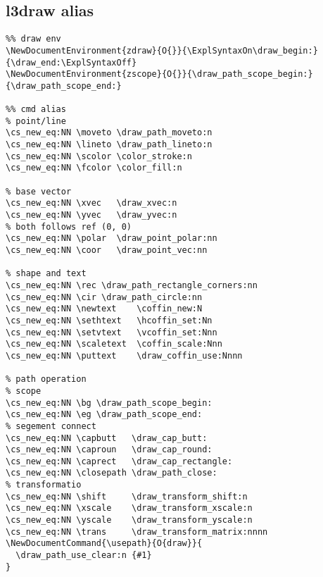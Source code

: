 \subsection{l3draw alias}
\begin{verbatim}
%% draw env 
\NewDocumentEnvironment{zdraw}{O{}}{\ExplSyntaxOn\draw_begin:}{\draw_end:\ExplSyntaxOff}
\NewDocumentEnvironment{zscope}{O{}}{\draw_path_scope_begin:}{\draw_path_scope_end:}

%% cmd alias
% point/line
\cs_new_eq:NN \moveto \draw_path_moveto:n
\cs_new_eq:NN \lineto \draw_path_lineto:n
\cs_new_eq:NN \scolor \color_stroke:n
\cs_new_eq:NN \fcolor \color_fill:n

% base vector
\cs_new_eq:NN \xvec   \draw_xvec:n
\cs_new_eq:NN \yvec   \draw_yvec:n
% both follows ref (0, 0)
\cs_new_eq:NN \polar  \draw_point_polar:nn 
\cs_new_eq:NN \coor   \draw_point_vec:nn  

% shape and text
\cs_new_eq:NN \rec \draw_path_rectangle_corners:nn
\cs_new_eq:NN \cir \draw_path_circle:nn
\cs_new_eq:NN \newtext    \coffin_new:N
\cs_new_eq:NN \sethtext   \hcoffin_set:Nn
\cs_new_eq:NN \setvtext   \vcoffin_set:Nnn
\cs_new_eq:NN \scaletext  \coffin_scale:Nnn
\cs_new_eq:NN \puttext    \draw_coffin_use:Nnnn

% path operation
% scope
\cs_new_eq:NN \bg \draw_path_scope_begin:
\cs_new_eq:NN \eg \draw_path_scope_end:
% segement connect
\cs_new_eq:NN \capbutt   \draw_cap_butt:
\cs_new_eq:NN \caproun   \draw_cap_round:
\cs_new_eq:NN \caprect   \draw_cap_rectangle:
\cs_new_eq:NN \closepath \draw_path_close:
% transformatio
\cs_new_eq:NN \shift     \draw_transform_shift:n
\cs_new_eq:NN \xscale    \draw_transform_xscale:n
\cs_new_eq:NN \yscale    \draw_transform_yscale:n
\cs_new_eq:NN \trans     \draw_transform_matrix:nnnn
\NewDocumentCommand{\usepath}{O{draw}}{
  \draw_path_use_clear:n {#1}
}
\end{verbatim}



